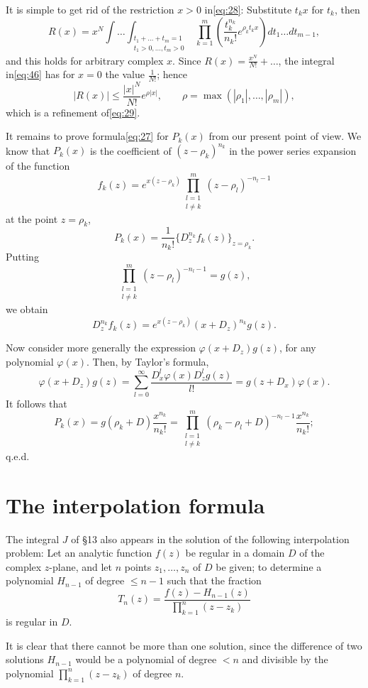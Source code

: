 It is simple to get rid of the restriction $x>0$ in\eqref{eq:28}: Substitute $t_k x$ for $t_k$, then
\begin{equation} R(x) = x^N \int \dots \int_{\substack{t_1 + \dots + t_m = 1 \\ t_1 > 0, \dots, t_m > 0}} \prod_{k=1}^{m} \left( \frac{t_k^{n_k}}{n_k!} e^{\rho_k t_k x} \right) dt_1 \dots dt_{m-1}, \tag{46}\label{eq:46} \end{equation}
and this holds for arbitrary complex $x$. Since $R(x) = \frac{x^N}{N!} + \dots$, the integral in\eqref{eq:46} has for $x=0$ the value $\frac{1}{N!}$; hence
\[ |R(x)| \le \frac{|x|^N}{N!} e^{\rho|x|}, \qquad \rho = \max(|\rho_1|, \dots, |\rho_m|), \]
which is a refinement of\eqref{eq:29}.

It remains to prove formula\eqref{eq:27} for $P_k(x)$ from our present point of view. We know that $P_k(x)$ is the coefficient of $(z-\rho_k)^{n_k}$ in the power series expansion of the function
\[ f_k(z) = e^{x(z-\rho_k)} \prod_{\substack{l=1\\l\neq k}}^m (z-\rho_l)^{-n_l-1} \]
at the point $z=\rho_k$,
\[ P_k(x) = \frac{1}{n_k!} \{D_z^{n_k} f_k(z)\}_{z=\rho_k}. \]
Putting
\[ \prod_{\substack{l=1\\ l \neq k}}^{m} (z - \rho_l)^{-n_l-1} = g(z), \]
we obtain
\[ D_z^{n_k} f_k(z) = e^{x(z-\rho_k)} (x+D_z)^{n_k} g(z). \]

Now consider more generally the expression $\varphi(x+D_z)g(z)$, for any polynomial $\varphi(x)$. Then, by Taylor's formula,
\[ \varphi(x+D_z)g(z) = \sum_{l=0}^{\infty} \frac{D_x^l \varphi(x) D_z^l g(z)}{l!} = g(z+D_x)\varphi(x). \]
It follows that
\[ P_k(x) = g(\rho_k+D) \frac{x^{n_k}}{n_k!} = \prod_{\substack{l=1\\l\neq k}}^{m} (\rho_k-\rho_l+D)^{-n_l-1} \frac{x^{n_k}}{n_k!}; \]
q.e.d.

\section{The interpolation formula}

The integral $J$ of \S 13 also appears in the solution of the following interpolation problem: Let an analytic function $f(z)$ be regular in a domain $D$ of the complex $z$-plane, and let $n$ points $z_1, \ldots, z_n$ of $D$ be given; to determine a polynomial $H_{n-1}$ of degree $\leq n-1$ such that the fraction
\[ T_n(z) = \frac{f(z) - H_{n-1}(z)}{\prod_{k=1}^n (z - z_k)} \]
is regular in $D$.

It is clear that there cannot be more than one solution, since the difference of two solutions $H_{n-1}$ would be a polynomial of degree $< n$ and divisible by the polynomial $\prod_{k=1}^n (z - z_k)$ of degree $n$.

